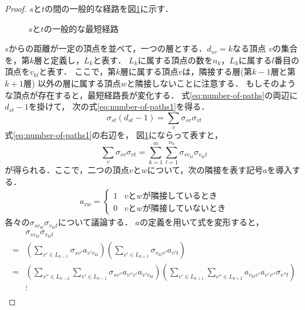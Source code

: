 \begin{proof}
  $s$と$t$の間の一般的な経路を図\ref{fig:proof-number-of-paths}に示す．
  \begin{figure}
    \centering
    \def\svgwidth{.5\columnwidth}
    
    \caption{$s$と$t$の一般的な最短経路}
    \label{fig:proof-number-of-paths}
  \end{figure}
  $s$からの距離が一定の頂点を並べて，一つの層とする．$d_{sv}=k$なる頂点
  $v$の集合を，第$k$層と定義し，$L_k$と表す．
  $L_k$に属する頂点の数を$n_k$，$L_k$に属する$l$番目の頂点を$v_{kl}$と表す．
  ここで，第$k$層に属する頂点$v$は，隣接する層(第$k-1$層と第$k+1$層)
  以外の層に属する頂点$w$と隣接しないことに注意する．
  もしそのような頂点が存在すると，最短経路長が変化する．
  式\eqref{eq:number-of-paths}の両辺に$d_{st}-1$を掛けて，
  次の式\eqref{eq:number-of-paths1}を得る．
  \begin{equation}
    \sigma_{st}(d_{st}-1)=\sum_{v}\sigma_{sv}\sigma_{vt}
    \label{eq:number-of-paths1}
  \end{equation}
  式\eqref{eq:number-of-paths1}の右辺を，
  図\ref{fig:proof-number-of-paths}にならって表すと，
  \begin{equation}
    \sum_{v}\sigma_{sv}\sigma_{vt}=
    \sum_{k=1}^m\sum_{l=1}^{n_k}\sigma_{sv_{kl}}\sigma_{v_{kl}t}
    \label{eq:number-of-paths2}
  \end{equation}
  が得られる．ここで，二つの頂点$v$と$w$について，次の隣接を表す記号$a$を導入する．
  \begin{align*}
    a_{vw}=
    \begin{cases}
      1 & vとwが隣接しているとき \\
      0 & vとwが隣接していないとき
    \end{cases}
  \end{align*}
  各々の$\sigma_{sv_{kl}}\sigma_{v_{kl}t}$について議論する．
  $a$の定義を用いて式を変形すると，
  \begin{align}
    &\sigma_{sv_{kl}}\sigma_{v_{kl}t}\nonumber\\
    =&\left(\sum_{v'\in L_{k-1}}\sigma_{sv'}a_{v'v_{kl}}\right)
    \left(\sum_{v'\in L_{k+1}}\sigma_{v_{kl}v'}a_{v't}\right)
    \nonumber\\
    =&\left(\sum_{v''\in L_{k-2}}\sum_{v'\in L_{k-1}}
    \sigma_{sv''}a_{v''v'}a_{v'v_{kl}}\right)
    \left(\sum_{v'\in L_{k+1}}\sum_{v''\in L_{k+2}}
    a_{v_{kl}v'}a_{v'v''}\sigma_{v''t}\right)
    \nonumber\\
    &\vdots\nonumber\\

\end{align}
\end{proof}

